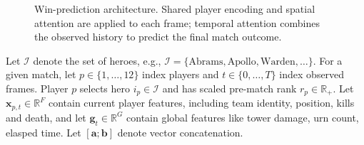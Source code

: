 \documentclass[11pt]{article}
\begin{document}
\begin{figure}[H]
    \caption{
        Win-prediction architecture.
        Shared player encoding and spatial attention are applied
        to each frame; temporal attention combines the observed
        history to predict the final match outcome.
    }
    \label{fig:final-architecture}
    \end{figure}
\newpage
    Let $\mathcal{I}$ denote the set of heroes, e.g., $\mathcal{I}=\{\text{Abrams},\text{Apollo},\text{Warden},\ldots\}$. For a given match, let $p\in\{1,\ldots,12\}$ index players and $t\in\{0,\ldots,T\}$ index observed frames. Player $p$ selects hero $i_p\in\mathcal{I}$ and has scaled pre-match rank $r_p\in\mathbb{R}_+$. Let $\mathbf{x}_{p,t}\in\mathbb{R}^{F}$ contain current player features, including team identity, position, kills and death, and let $\mathbf{g}_t\in\mathbb{R}^{G}$ contain global features like tower damage, urn count, elasped time. Let $[\mathbf{a};\mathbf{b}]$ denote vector concatenation.
\end{document}
